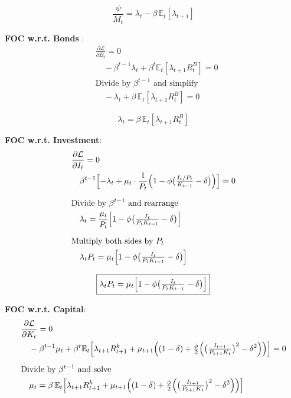 \documentclass[11pt,preprint]{elsarticle}
\numberwithin{equation}{section}
\numberwithin{figure}{section}
\numberwithin{table}{section}
\begin{document}
\begin{equation}\label{foc_M_app}
\boxed{\frac{\psi}{M_t} = \lambda_t - \beta\,\mathbb{E}_t[\lambda_{t+1}]}
\end{equation}

\textbf{FOC w.r.t. Bonds} : \begin{align*}
  & \frac{\partial \mathcal{L}}{\partial B_t} = 0 \\
  & \quad -\beta^{t-1}\lambda_t + \beta^t\mathbb{E}_t[\lambda_{t+1}R^B_t] = 0 \\[6pt]
  & \text{Divide by }\beta^{t-1}\text{ and simplify} \\
  & \quad -\lambda_t + \beta\,\mathbb{E}_t[\lambda_{t+1}R^B_t] = 0
\end{align*}

\begin{equation}\label{foc_B_app}
\boxed{\lambda_t = \beta\,\mathbb{E}_t[\lambda_{t+1}R^B_t]}
\end{equation}

\textbf{FOC w.r.t. Investment}: \begin{align*}
  & \frac{\partial \mathcal{L}}{\partial I_t} = 0 \\
  & \quad \beta^{t-1}\Bigl[ -\lambda_t 
      + \mu_t \cdot \frac{1}{P_t} 
        \Bigl( 1 - \phi \bigl( \tfrac{I_t/P_t}{K_{t-1}} - \delta \bigr) \Bigr)
    \Bigr] = 0 \\[6pt]
  & \text{Divide by }\beta^{t-1}\text{ and rearrange} \\
  & \quad \lambda_t = \frac{\mu_t}{P_t} 
        \Bigl[ 1 - \phi \bigl( \tfrac{I_t}{P_t K_{t-1}} - \delta \bigr) \Bigr] \\[6pt]
  & \text{Multiply both sides by }P_t \\
  & \quad \lambda_t P_t = \mu_t 
        \Bigl[ 1 - \phi \bigl( \tfrac{I_t}{P_t K_{t-1}} - \delta \bigr) \Bigr]
\end{align*}

\begin{equation}\label{foc_I_app}
\boxed{\lambda_t P_t = \mu_t 
  \Bigl[ 1 - \phi \bigl( \tfrac{I_t}{P_t K_{t-1}} - \delta \bigr) \Bigr]}
\end{equation}

\textbf{FOC w.r.t. Capital}: \begin{align*}
  & \frac{\partial \mathcal{L}}{\partial K_t} = 0 \\
  & \quad -\beta^{t-1}\mu_t 
    + \beta^t\mathbb{E}_t\Bigl[
        \lambda_{t+1}R^k_{t+1}
      + \mu_{t+1}\Bigl(
          (1-\delta) 
        + \tfrac{\phi}{2}\Bigl(
            \bigl(\tfrac{I_{t+1}}{P_{t+1}K_t}\bigr)^2 
          - \delta^2
          \Bigr)
        \Bigr)
      \Bigr] = 0 \\[6pt]
  & \text{Divide by }\beta^{t-1}\text{ and solve} \\
  & \quad \mu_t = \beta\,\mathbb{E}_t\Bigl[
        \lambda_{t+1}R^k_{t+1}
      + \mu_{t+1}\Bigl(
          (1-\delta)
        + \tfrac{\phi}{2}\Bigl(
            \bigl(\tfrac{I_{t+1}}{P_{t+1}K_t}\bigr)^2
          - \delta^2
          \Bigr)
        \Bigr)
      \Bigr]  
\end{align*}
\end{document}
